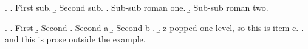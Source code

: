 

\ex.
\a. First sub.
\b. Second sub.
\a. Sub-sub roman one.
\b. Sub-sub roman two.

\ex.
\a. First
\b. Second
\a. Second a
\b. Second b
\z.
\b. z popped one level, so this is item c.
\z.
and this is prose outside the example.

